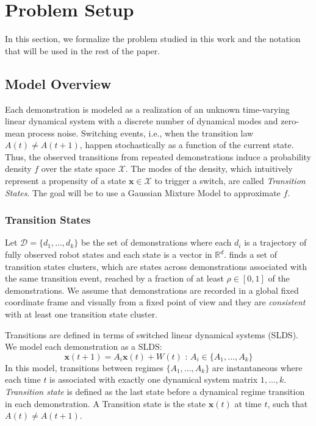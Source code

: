 \documentclass[0-main.tex]{subfiles}
\begin{document}
\section{Problem Setup}
\label{sec:tsc}
In this section, we formalize the problem studied in this work and the notation that will be used in the rest of the paper.

\subsection{Model Overview \label{sec:model}}
Each demonstration is modeled as a realization of an unknown time-varying linear dynamical system with a discrete number of dynamical modes and zero-mean process noise.
Switching events, i.e., when the transition law $A(t) \ne A(t+1)$, happen stochastically as a function of the current state. 
Thus, the observed transitions from repeated demonstrations induce a probability density $f$ over the state space $\mathcal{X}$.
The modes of the density, which intuitively represent a propensity of a state $\mathbf{x} \in \mathcal{X}$ to trigger a switch, are called \emph{Transition States}.
The goal will be to use a Gaussian Mixture Model to approximate $f$. 

\subsubsection{Transition States}
Let $\mathcal{D}=\{d_1,...,d_k\}$ be the set of demonstrations where each $d_i$ is a trajectory of fully observed robot states and each state is a vector in $\mathbb{R}^d$.
\tsco finds a set of transition states clusters, which are states across demonstrations associated with the same transition event, reached by a fraction of at least $\rho \in [0,1]$ of the demonstrations.
We assume that demonstrations are recorded in a global fixed coordinate frame and visually from a fixed point of view and they are \emph{consistent} with at least one transition state cluster.

Transitions are defined in terms of switched linear dynamical systems (SLDS).
We model each demonstration as a SLDS:
\vspace{-3pt}
\[
\mathbf{x}(t+1) = A_{i}\mathbf{x}(t) + W(t) \text{ : } A_i \in \{A_1,...,A_k\}
\]
In this model, transitions between regimes $\{A_1,...,A_k\}$ are instantaneous where each time $t$ is associated with exactly one dynamical system matrix $1,...,k$. \emph{Transition state} is defined as the last state before a dynamical regime transition in each demonstration.
A Transition state is the state $\mathbf{x}(t)$ at time $t$, such that $A(t) \ne A(t+1)$.
\end{document}
